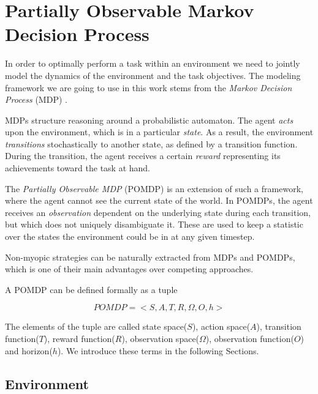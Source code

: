 \section{Partially Observable Markov Decision Process}\label{ref:pomdp}

In order to optimally perform a task within an environment we need to jointly model the dynamics of
the environment and the task objectives. The modeling framework we are going to use in this work
stems from the \textit{Markov Decision Process} (MDP) \cite{cit:suttonbarto}.



MDPs structure reasoning around a probabilistic automaton. The agent \textit{acts} upon the
environment, which is in a particular \textit{state}. As a result, the environment
\textit{transitions} stochastically to another state, as defined by a transition function. During
the transition, the agent receives a certain \textit{reward} representing its achievements
toward the task at hand.



The \textit{Partially Observable MDP} (POMDP) \cite{cit:pomdp} is an extension of such a framework,
where the agent cannot see the current state of the world. In POMDPs, the agent receives an
\textit{observation} dependent on the underlying state during each transition, but which does not
uniquely disambiguate it.  These are used to keep a statistic over the states the environment could
be in at any given timestep.

Non-myopic strategies can be naturally extracted from MDPs and POMDPs, which is one of their main
advantages over competing approaches.

A POMDP can be defined formally as a tuple

\[ POMDP = <S,A,T,R,\Omega,O,h> \]

The elements of the tuple are called state space($S$), action space($A$), transition function($T$),
reward function($R$), observation space($\Omega$), observation function($O$) and horizon($h$). We
introduce these terms in the following Sections.

\subsection{Environment}

